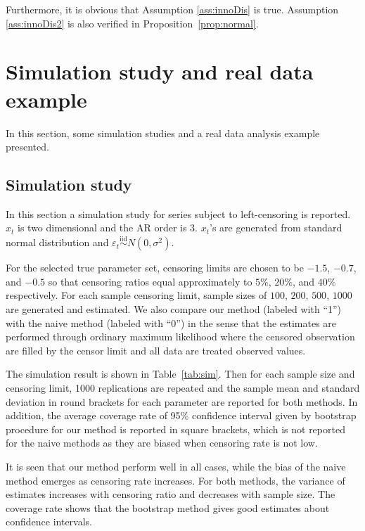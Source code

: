 \documentclass[a4paper,12pt]{article}
\def \iid {\stackrel{\mathrm{iid}}{\sim}}
\begin{document}
Furthermore, it is obvious that Assumption \ref{ass:innoDis} is true. Assumption \ref{ass:innoDis2} is also verified in Proposition~\ref{prop:normal}. 

\section{Simulation study and real data example}
\label{simulation}
In this section, some simulation studies and a real data analysis example presented.

\subsection{Simulation study}
In this section a simulation study for series subject to left-censoring is reported.
$x_t$ is two dimensional and the AR order is 3. 
$x_t$'s are generated from standard normal distribution and $\varepsilon_t\iid N(0,\sigma^2)$.

For the selected true parameter set, 
censoring limits are chosen to be $-1.5$, $-0.7$, and $-0.5$ so that censoring ratios equal approximately to $5\%$, $20\%$, and $40\%$ respectively.
For each sample censoring limit, sample sizes of $100$, $200$, $500$, $1000$ are generated and estimated. 
We also compare our method (labeled with ``1'') with the naive method (labeled with ``0'')
in the sense that the estimates are performed through ordinary maximum likelihood where the censored observation are filled by the censor limit and all data are treated observed values.

The simulation result is shown in Table~\ref{tab:sim}.
Then for each sample size and censoring limit, 1000 replications are repeated and the sample mean and standard deviation in round brackets for each parameter are reported for both methods.
In addition, the average coverage rate of 95\% confidence interval given by bootstrap procedure for our method is reported in square brackets, 
which is not reported for the naive methods as they are biased when censoring rate is not low.

It is seen that our method perform well in all cases, while the bias of the naive method emerges as censoring rate increases. For both methods, the variance of estimates increases with censoring ratio and decreases with sample size. The coverage rate shows that the bootstrap method gives good estimates about confidence intervals.
\end{document}
